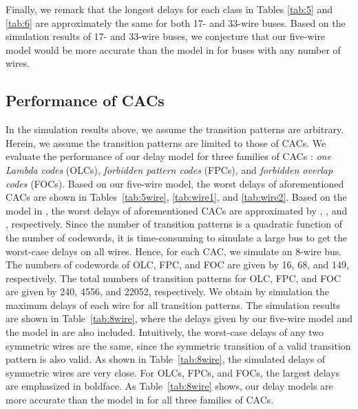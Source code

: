 \documentclass[10pt,journal]{IEEEtran}
\begin{document}
Finally, we remark that the longest delays for each class in Tables \ref{tab:5} and \ref{tab:6} are approximately the same for both 17- and 33-wire buses.
Based on the simulation results of 17- and 33-wire buses, we conjecture that our five-wire model would be more accurate than the model in \cite{Sot01} for buses with any number of wires.





\subsection{Performance of CACs}\label{sec:simCACs}
In the simulation results above, we assume the transition patterns are arbitrary. Herein, we assume the transition patterns are limited to those of CACs. We evaluate the performance of our delay model for three families of CACs \cite{Dua01,Vic01,Sri07}: {\it one Lambda codes} (OLCs), {\it forbidden pattern codes} (FPCs), and {\it forbidden overlap codes} (FOCs).
Based on our five-wire model, the worst delays of aforementioned CACs are shown in Tables~\ref{tab:5wire}, \ref{tab:wire1}, and \ref{tab:wire2}.
Based on the model in \cite{Sot01}, the worst delays of aforementioned CACs are approximated by , , and , respectively.
Since the number of transition patterns is a quadratic function of the number of codewords, it is time-consuming to simulate a large bus to get the worst-case delays on all wires.
Hence, for each CAC, we simulate an 8-wire bus. The numbers of codewords of OLC, FPC, and FOC are given by 16, 68, and 149, respectively. The total numbers of transition patterns for OLC, FPC, and FOC are given by 240, 4556, and 22052, respectively.
We obtain by simulation the maximum delays of each wire for all transition patterns. The simulation results are shown in Table~\ref{tab:8wire}, where the delays given by our five-wire model and the model in \cite{Sot01} are also included. Intuitively, the worst-case delays of any two symmetric wires are the same, since the symmetric transition of a valid transition pattern is also valid.
As shown in Table~\ref{tab:8wire}, the simulated delays of symmetric wires are very close.
For OLCs, FPCs, and FOCs, the largest delays are emphasized in boldface. As Table~\ref{tab:8wire} shows,
our delay models are more accurate than the model in \cite{Sot01} for all three families of CACs.
\end{document}
